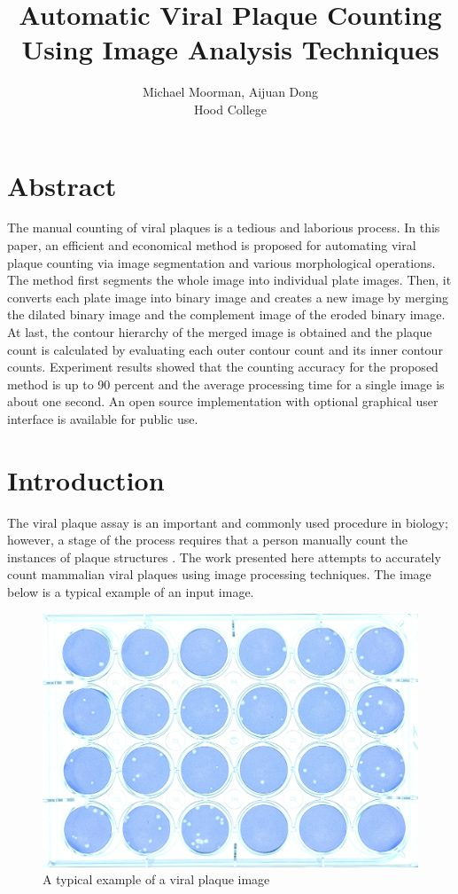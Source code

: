 \documentclass[11pt,final,twocolumn]{IEEEtran}
\begin{document}
\title{Automatic Viral Plaque Counting Using Image  Analysis Techniques}
\author{Michael Moorman, Aijuan Dong \\
Hood College}
\maketitle
\section{Abstract}
The manual counting of viral plaques is a tedious and laborious process. In this paper, an efficient and economical method is proposed for automating viral plaque counting via image segmentation and various morphological operations. The method first segments the whole image into individual plate images. Then, it converts each plate image into binary image and creates a new image by merging the dilated binary image and the complement image of the eroded binary image. At last, the contour hierarchy of the merged image is obtained and the plaque count is calculated by evaluating each outer contour count and its inner contour counts. Experiment results showed that the counting accuracy for the proposed method is up to 90 percent and the average processing time for a single image is about one second. An open source implementation with optional graphical user interface is available for public use.


\section{Introduction}
The viral plaque assay is an important and commonly used procedure in biology; however, a stage of the process requires that a person manually count the instances of plaque structures . The work presented here attempts to accurately count mammalian  viral plaques using image processing techniques. The image below is a typical example of an input image.
\begin{figure}[h]
\centering
\includegraphics[width=.4\textwidth]{sample.jpg}
\caption{A typical example of a viral plaque image}
\label{fig:sample}
\end{figure}
\end{document}

